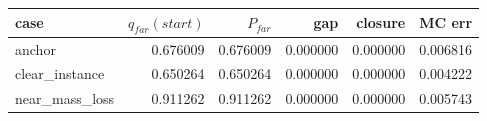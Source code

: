 \begin{tabular}{lrrrrr}
\toprule
case & $q_{far}(start)$ & $P_{far}$ & gap & closure & MC err \\
\midrule
anchor & 0.676009 & 0.676009 & 0.000000 & 0.000000 & 0.006816 \\
clear\_instance & 0.650264 & 0.650264 & 0.000000 & 0.000000 & 0.004222 \\
near\_mass\_loss & 0.911262 & 0.911262 & 0.000000 & 0.000000 & 0.005743 \\
\bottomrule
\end{tabular}

